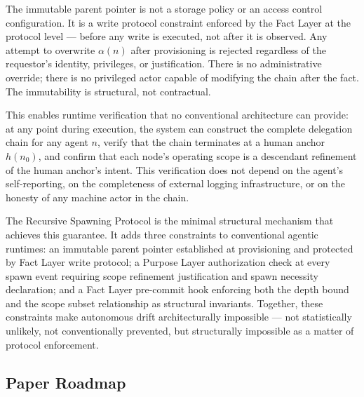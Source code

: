 The immutable parent pointer is not a storage policy or an access control configuration. It is a write protocol constraint enforced by the Fact Layer at the protocol level — before any write is executed, not after it is observed. Any attempt to overwrite $\alpha(n)$ after provisioning is rejected regardless of the requestor's identity, privileges, or justification. There is no administrative override; there is no privileged actor capable of modifying the chain after the fact. The immutability is structural, not contractual.

This enables runtime verification that no conventional architecture can provide: at any point during execution, the system can construct the complete delegation chain for any agent $n$, verify that the chain terminates at a human anchor $h(n_0)$, and confirm that each node's operating scope is a descendant refinement of the human anchor's intent. This verification does not depend on the agent's self-reporting, on the completeness of external logging infrastructure, or on the honesty of any machine actor in the chain.

The Recursive Spawning Protocol is the minimal structural mechanism that achieves this guarantee. It adds three constraints to conventional agentic runtimes: an immutable parent pointer established at provisioning and protected by Fact Layer write protocol; a Purpose Layer authorization check at every spawn event requiring scope refinement justification and spawn necessity declaration; and a Fact Layer pre-commit hook enforcing both the depth bound and the scope subset relationship as structural invariants. Together, these constraints make autonomous drift architecturally impossible — not statistically unlikely, not conventionally prevented, but structurally impossible as a matter of protocol enforcement.

\subsection{Paper Roadmap}

